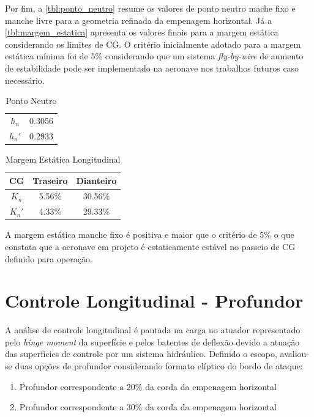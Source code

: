 Por fim, a \autoref{tbl:ponto_neutro} resume os valores de ponto neutro mache fixo e manche livre para a geometria refinada da empenagem horizontal. Já a \autoref{tbl:margem_estatica} apresenta os valores finais para a margem estática considerando os limites de CG. O critério inicialmente adotado para a margem estática mínima foi de 5\% considerando que um sistema \textit{fly-by-wire} de aumento de estabilidade pode ser implementado na aeronave nos trabalhos futuros caso necessário.

\begin{table}[H]
\centering
\begin{tabular}{cc}
\toprule
$ h_n $ & 0.3056 \\
$ h_n' $ & 0.2933 \\
\bottomrule
\end{tabular}
\caption[Ponto Neutro]{Ponto Neutro}
\label{tbl:ponto_neutro}
\end{table}

\begin{table}[H]
\centering
\begin{tabular}{ccc}
\toprule
CG & Traseiro & Dianteiro \\ \midrule
$ K_n $ & 5.56\% & 30.56\% \\
$ K_n' $ & 4.33\% & 29.33\% \\
\bottomrule
\end{tabular}
\caption[Margem Estática Longitudinal]{Margem Estática Longitudinal}
\label{tbl:margem_estatica}
\end{table}

A margem estática manche fixo é positiva e maior que o critério de 5\% o que constata que a aeronave em projeto é estaticamente estável no passeio de CG definido para operação.

\section{Controle Longitudinal - Profundor}
\label{controlelongitudinal}

A análise de controle longitudinal é pautada na carga no atuador representado pelo \textit{hinge moment} da superfície e pelos batentes de deflexão devido a atuação das superfícies de controle por um sistema hidráulico. Definido o escopo, avaliou-se duas opções de profundor considerando formato elíptico do bordo de ataque:

\begin{enumerate}
\item Profundor correspondente a 20\% da corda da empenagem horizontal

\item Profundor correspondente a 30\% da corda da empenagem horizontal
\end{enumerate}


